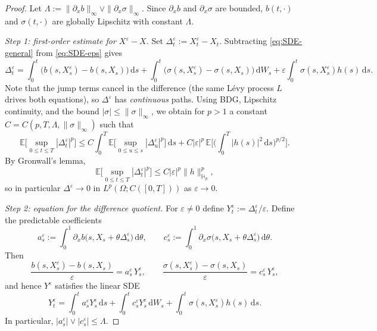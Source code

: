 \documentclass[10pt,a4paper]{amsart}
\newcommand{\E}{\mathbb{E}}
\newcommand{\Hb}{\mathbb{H}}
\newcommand{\dd}{\mathrm{d}}
\begin{document}
\begin{proof}
Let $\Lambda:=\|\partial_x b\|_\infty\vee \|\partial_x\sigma\|_\infty$.
Since $\partial_x b$ and $\partial_x\sigma$ are bounded, $b(t,\cdot)$ and $\sigma(t,\cdot)$ are globally Lipschitz with constant $\Lambda$.

\medskip
\noindent\emph{Step 1: first-order estimate for $X^\varepsilon-X$.}
Set $\Delta_t^\varepsilon:=X_t^\varepsilon-X_t$. Subtracting \eqref{eq:SDE-general} from \eqref{eq:SDE-eps} gives
\[
\Delta_t^\varepsilon=\int_0^t\!\big(b(s,X_s^\varepsilon)-b(s,X_s)\big)\,\dd s
+\int_0^t\!\big(\sigma(s,X_s^\varepsilon)-\sigma(s,X_s)\big)\,\dd W_s
+\varepsilon\int_0^t \sigma(s,X_s^\varepsilon)h(s)\,\dd s.
\]
Note that the jump terms cancel in the difference (the same L\'evy process $L$ drives both equations), so $\Delta^\varepsilon$ has \emph{continuous}
paths.
Using BDG, Lipschitz continuity, and the bound $|\sigma|\le\|\sigma\|_\infty$, we obtain for $p>1$ a constant $C=C(p,T,\Lambda,\|\sigma\|_\infty)$ such that
\begin{equation}\label{eq:Delta-eps-bound}
\E\Big[\sup_{0\le t\le T}|\Delta_t^\varepsilon|^p\Big]
\le C\int_0^T \E\Big[\sup_{0\le u\le s}|\Delta_u^\varepsilon|^p\Big]\,\dd s
+C|\varepsilon|^p\,\E\Big[\Big(\int_0^T |h(s)|^2\,\dd s\Big)^{p/2}\Big].
\end{equation}
By Gronwall's lemma,
\begin{equation}
\E\Big[\sup_{0\le t\le T}|\Delta_t^\varepsilon|^p\Big]\le C|\varepsilon|^p\|h\|_{\Hb_p}^p,
\end{equation}
so in particular $\Delta^\varepsilon\to0$ in $L^p(\Omega;C([0,T]))$ as $\varepsilon\to0$.

\medskip
\noindent\emph{Step 2: equation for the difference quotient.}
For $\varepsilon\neq 0$ define $Y_t^\varepsilon:=\Delta_t^\varepsilon/\varepsilon$. Define the predictable coefficients
\[
a_s^\varepsilon:=\int_0^1 \partial_x b\big(s, X_s+\theta\Delta_s^\varepsilon\big)\,\dd\theta,
\qquad
c_s^\varepsilon:=\int_0^1 \partial_x \sigma\big(s, X_s+\theta\Delta_s^\varepsilon\big)\,\dd\theta.
\]
Then
\[
\frac{b(s,X_s^\varepsilon)-b(s,X_s)}{\varepsilon}=a_s^\varepsilon\,Y_s^\varepsilon,
\qquad
\frac{\sigma(s,X_s^\varepsilon)-\sigma(s,X_s)}{\varepsilon}=c_s^\varepsilon\,Y_s^\varepsilon,
\]
and hence $Y^\varepsilon$ satisfies the linear SDE
\begin{equation}\label{eq:Yeps}
Y_t^\varepsilon=\int_0^t a_s^\varepsilon Y_s^\varepsilon\,\dd s+\int_0^t c_s^\varepsilon Y_s^\varepsilon\,\dd W_s+\int_0^t \sigma(s,X_s^\varepsilon)h(s)\,\dd s.
\end{equation}
In particular, $|a_s^\varepsilon|\vee |c_s^\varepsilon|\le \Lambda$.


\end{proof}
\end{document}
